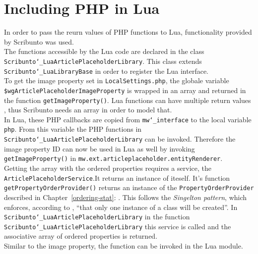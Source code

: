 \section{Including PHP in Lua}\label{including-lua}


In order to pass the reurn values of PHP functions to Lua, functionality provided by Scribunto was used. \\
The functions accessible by the Lua code are declared in the class \texttt{Scribunto\char`_LuaArticlePlaceholderLibrary}. This class extends \texttt{Scribunto\char`_LuaLibraryBase} in order to register the Lua interface. \\
To get the image property set in \texttt{LocalSettings.php}, the globale variable \texttt{\$wgArticlePlaceholderImageProperty} is wrapped in an array and returned in the function \texttt{getImageProperty()}. Lua functions can have multiple return values \citep{luabook:01}, thus Scribunto needs an array in order to model that. \\
In Lua, these PHP callbacks are copied from \texttt{mw\char`_interface} to the local variable \texttt{php}. From this variable the PHP functions in \texttt{Scribunto\char`_LuaArticlePlaceholderLibrary} can be invoked. Therefore the image property ID can now be used in Lua as well by invoking \texttt{getImageProperty()} in \texttt{mw.ext.articleplaceholder.entityRenderer}. \\
Getting the array with the ordered properties requires a service, the \texttt{ArticlePlaceholderService}.It returns an instance of iteself. It's function \texttt{getPropertyOrderProvider()} returns an instance of the \texttt{PropertyOrderProvider} described in Chapter~\ref{ordering-stat}: . This follows the \textit{Singelton pattern}, which enforces, according to \citet{designpattern}, ``that only one instance of a class will be created''.
In \texttt{Scribunto\char`_LuaArticlePlaceholderLibrary} in the function \texttt{Scribunto\char`_LuaArticlePlaceholderLibrary} this service is called and the associative array of ordered properties is returned.\\
Similar to the image property, the function can be invoked in the Lua module.
